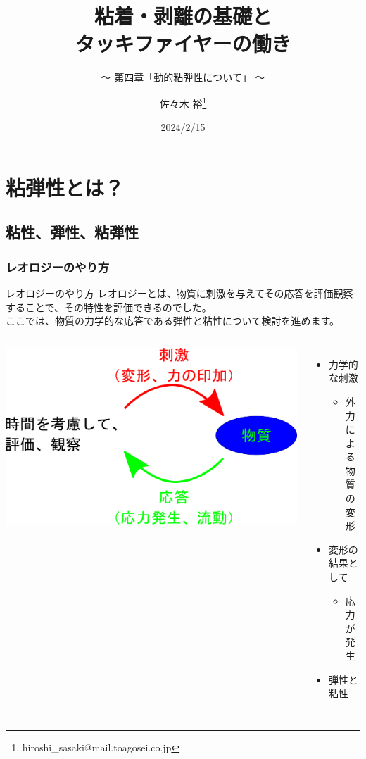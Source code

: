 \documentclass[unicode,12pt]{beamer}%
\title{粘着・剥離の基礎と\\タッキファイヤーの働き}
\subtitle{～ 第四章「動的粘弾性について」 ～}
\author[東亞合成 佐々木]{佐々木 裕\thanks{hiroshi\_sasaki@mail.toagosei.co.jp}}
\institute[東亞合成]{東亞合成株式会社}
\date{2024/2/15}
\begin{document}
\maketitle

\begin{frame} 
    \tableofcontents[]
\end{frame} 

\section{粘弾性とは？}
\subsection{粘性、弾性、粘弾性}
\begin{frame}
	\frametitle{レオロジーのやり方}
	\begin{block}{レオロジーのやり方}
		レオロジーとは、物質に刺激を与えてその応答を評価観察することで、その特性を評価できるのでした。\\
		ここでは、物質の力学的な応答である弾性と粘性について検討を進めます。
	\end{block}
	\begin{columns}[T, onlytextwidth]
			\includegraphics[width=\textwidth]{Rheo_method.png}
			\begin{itemize}
				\item 力学的な刺激
				\begin{itemize}
					\item 外力による\\物質の変形
				\end{itemize}
				\item 変形の結果として
				\begin{itemize}
					\item 応力が発生
				\end{itemize}
				\item 弾性と粘性
			\end{itemize}
	\end{columns}
\end{frame}
\end{document}
